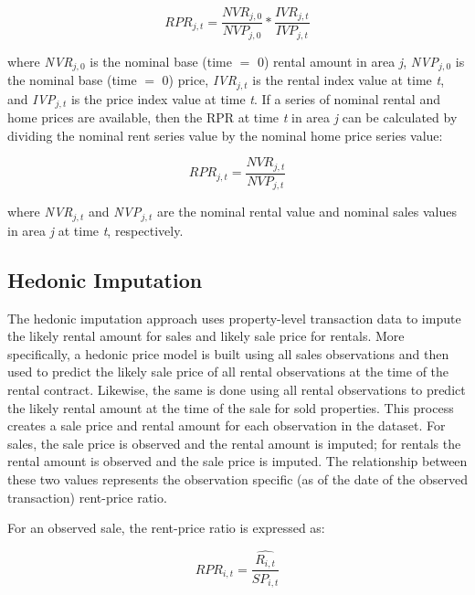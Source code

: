 \documentclass{article}\usepackage[]{graphicx}\usepackage[]{color}
\begin{document}
\begin{equation}
 RPR_{j,t} = \frac{NVR_{j,0}}{NVP_{j,0}} * \frac{IVR_{j, t}}{IVP_{j,t}}
\end{equation}
  
where \textit{NVR$_{j,0}$} is the nominal base (time $=$ 0) rental amount in area \textit{j}, \textit{NVP$_{j,0}$} is the nominal base (time $=$ 0) price, \textit{IVR$_{j,t}$} is the rental index value at time \textit{t}, and \textit{IVP$_{j,t}$} is the price index value at time \textit{t}.  If a series of nominal rental and home prices are available, then the RPR at time \textit{t} in area \textit{j} can be calculated by dividing the nominal rent series value by the nominal home price series value:

\begin{equation}
 RPR_{j,t} = \frac{NVR_{j, t}}{NVP_{j,t}}
\end{equation}

where \textit{NVR$_{j,t}$} and \textit{NVP$_{j,t}$} are the nominal rental value and nominal sales values in area \textit{j} at time \textit{t}, respectively.

\subsection*{Hedonic Imputation}
  
The hedonic imputation approach uses property-level transaction data to impute the likely rental amount for sales and likely sale price for rentals.  More specifically, a hedonic price model is built using all sales observations and then used to predict the likely sale price of all rental observations at the time of the rental contract.  Likewise, the same is done using all rental observations to predict the likely rental amount at the time of the sale for sold properties.  This process creates a sale price and rental amount for each observation in the dataset.  For sales, the sale price is observed and the rental amount is imputed; for rentals the rental amount is observed and the sale price is imputed.  The relationship between these two values represents the observation specific (as of the date of the observed transaction) rent-price ratio.\par 
  
For an observed sale, the rent-price ratio is expressed as:\par
  
\begin{equation}
  RPR_{i,t} = \frac{\widehat{R_{i,t}}
    }{
    SP_{i,t}
    }
\end{equation}
  
\end{document}
